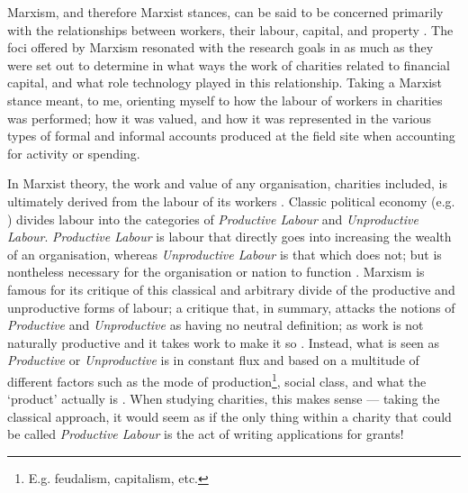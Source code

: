 Marxism, and therefore Marxist stances, can be said to be concerned primarily with the relationships between workers, their labour, capital, and property . The foci offered by Marxism resonated with the research goals in as much as they were set out to determine in what ways the work of charities related to financial capital, and what role technology played in this relationship. Taking a Marxist stance meant, to me, orienting myself to how the labour of workers in charities was performed; how it was valued, and how it was represented in the various types of formal and informal accounts produced at the field site when accounting for activity or spending.

In Marxist theory, the work and value of any organisation, charities included, is ultimately derived from the labour of its workers \cite{marx_contribution_1970}. Classic political economy (e.g. \cite{smith_inquiry_1785}) divides labour into the categories of \textit{Productive Labour} and \textit{Unproductive Labour}. \textit{Productive Labour} is labour that directly goes into increasing the wealth of an organisation, whereas \textit{Unproductive Labour} is that which does not; but is nontheless necessary for the organisation or nation to function \cite{smith_inquiry_1785}. Marxism is famous for its critique of this classical and arbitrary divide of the productive and unproductive forms of labour; a critique that, in summary, attacks the notions of \textit{Productive} and \textit{Unproductive} as having no neutral definition; as work is not naturally productive and it takes work to make it so \cite{marx_capital_1974, marx_theories_1964}. Instead, what is seen as \textit{Productive} or \textit{Unproductive} is in constant flux and based on a multitude of different factors such as the mode of production\footnote{E.g. feudalism, capitalism, etc.}, social class, and what the `product' actually is \cite{marx_capital_1974}. When studying charities, this makes sense --- taking the classical approach, it would seem as if the only thing within a charity that could be called \textit{Productive Labour} is the act of writing applications for grants!

